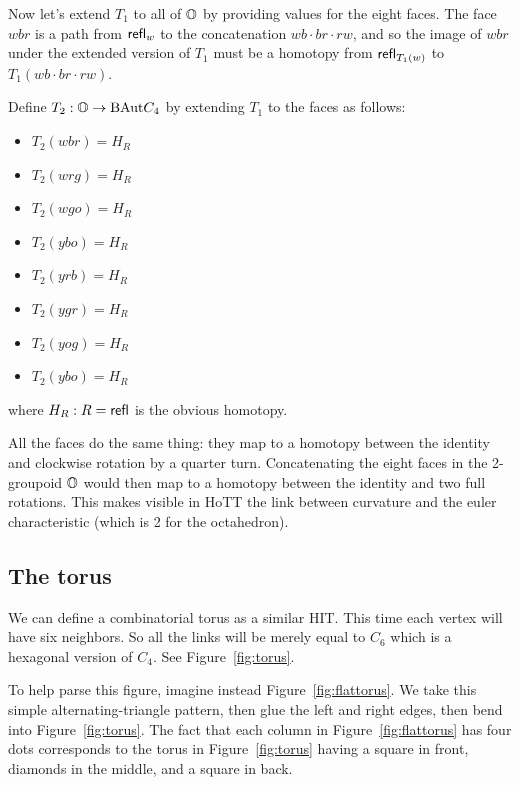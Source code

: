 Now let's extend \( T_1 \) to all of \( \mathbb{O} \) by providing values for the eight faces. The face \( wbr \) is a path from \( \mathsf{refl}_w \) to the concatenation \( wb\cdot br\cdot rw \), and so the image of \( wbr \) under the extended version of \( T_1 \) must be a homotopy from \( \mathsf{refl}_{T_1(w)} \) to \( T_1(wb\cdot br\cdot rw) \).

\begin{mydef}
Define \( T_2:\mathbb{O}\to\mathrm{BAut} C_4 \) by extending \( T_1 \) to the faces as follows:
\begin{itemize}
\item \( T_2(wbr)=H_R \) 
\item \( T_2(wrg)=H_R \)
\item \( T_2(wgo)=H_R \)
\item \( T_2(ybo)=H_R \)
\item \( T_2(yrb)=H_R \) 
\item \( T_2(ygr)=H_R \)
\item \( T_2(yog)=H_R \)
\item \( T_2(ybo)=H_R \)
\end{itemize}
where \( H_R:R=\mathsf{refl} \) is the obvious homotopy.
\end{mydef}

All the faces do the same thing: they map to a homotopy between the identity and clockwise rotation by a quarter turn. Concatenating the eight faces in the 2-groupoid \( \mathbb{O} \) would then map to a homotopy between the identity and two full rotations. This makes visible in HoTT the link between curvature and the euler characteristic (which is 2 for the octahedron).

\subsection{The torus}

We can define a combinatorial torus as a similar HIT. This time each vertex will have six neighbors. So all the links will be merely equal to \( C_6 \) which is a hexagonal version of \( C_4 \). See Figure~\ref{fig:torus}. 

To help parse this figure, imagine instead Figure~\ref{fig:flattorus}. We take this simple alternating-triangle pattern, then glue the left and right edges, then bend into Figure~\ref{fig:torus}. The fact that each column in Figure~\ref{fig:flattorus} has four dots corresponds to the torus in Figure~\ref{fig:torus} having a square in front, diamonds in the middle, and a square in back.

